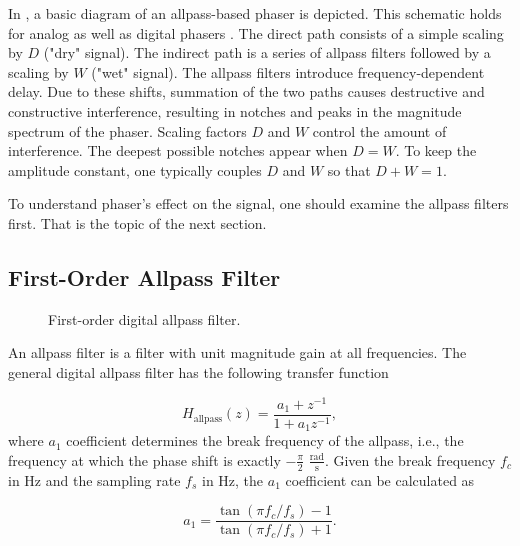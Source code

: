 In , a basic diagram of an allpass-based phaser is depicted. This schematic holds for analog as well as digital phasers \cite{PASPWEB2010}. The direct path consists of a simple scaling by $D$ ("dry" signal). The indirect path is a series of allpass filters followed by a scaling by $W$ ("wet" signal). The allpass filters introduce frequency-dependent delay. Due to these shifts, summation of the two paths causes destructive and constructive interference, resulting in notches and peaks in the magnitude spectrum of the phaser. Scaling factors $D$ and $W$ control the amount of interference. The deepest possible notches appear when $D = W$. To keep the amplitude constant, one typically couples $D$ and $W$ so that $D + W = 1$.

To understand phaser's effect on the signal, one should examine the allpass filters first. That is the topic of the next section.

\subsection{First-Order Allpass Filter}
\label{sec:first_order_allpass_filter}
\begin{figure}
    \centering
    \vspace{2mm}
    
    \caption{First-order digital allpass filter.}
    \label{fig:first_order_allpass_filter}
\end{figure}

An allpass filter is a filter with unit magnitude gain at all frequencies. The general digital allpass filter has the following transfer function \cite{Zoelzer2011,PASPWEB2010,Kiiski2016}

\begin{equation}
    H_\text{allpass}(z) = \frac{a_1 + z^{-1}}{1 + a_1 z^{-1}},
    \label{eq:allpass_transfer_function}
\end{equation}
where $a_1$ coefficient determines the break frequency of the allpass, i.e., the frequency at which the phase shift is exactly $-\frac{\pi}{2}$ $\frac{\text{rad}}{\text{s}}$. Given the break frequency $f_c$ in Hz and the sampling rate $f_s$ in Hz, the $a_1$ coefficient can be calculated as

\begin{equation}
    a_1 = \frac{\tan (\pi f_c / f_s) - 1}{\tan(\pi f_c / f_s) + 1}.
    \label{eq:allpass_coefficient}
\end{equation}

